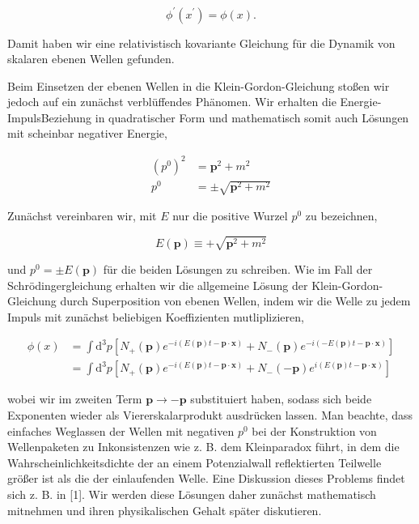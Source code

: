 \documentclass[10pt, letterpaper]{article}
\begin{document}
$$
\phi^{\prime}\left(x^{\prime}\right)=\phi(x) .
$$

Damit haben wir eine relativistisch kovariante Gleichung für die Dynamik von skalaren ebenen Wellen gefunden.

Beim Einsetzen der ebenen Wellen in die Klein-Gordon-Gleichung stoßen wir jedoch auf ein zunächst verblüffendes Phänomen. Wir erhalten die Energie-ImpulsBeziehung in quadratischer Form und mathematisch somit auch Lösungen mit scheinbar negativer Energie,

$$
\begin{aligned}
\left(p^{0}\right)^{2} & =\mathbf{p}^{2}+m^{2} \\
p^{0} & = \pm \sqrt{\mathbf{p}^{2}+m^{2}}
\end{aligned}
$$

Zunächst vereinbaren wir, mit $E$ nur die positive Wurzel $p^{0}$ zu bezeichnen,

$$
E(\mathbf{p}) \equiv+\sqrt{\mathbf{p}^{2}+m^{2}}
$$

und $p^{0}= \pm E(\mathbf{p})$ für die beiden Lösungen zu schreiben. Wie im Fall der Schrödingergleichung erhalten wir die allgemeine Lösung der Klein-Gordon-Gleichung durch Superposition von ebenen Wellen, indem wir die Welle zu jedem Impuls mit zunächst beliebigen Koeffizienten mutliplizieren,

$$
\begin{aligned}
\phi(x) & =\int \mathrm{d}^{3} p\left[N_{+}(\mathbf{p}) e^{-i(E(\mathbf{p}) t-\mathbf{p} \cdot \mathbf{x})}+N_{-}(\mathbf{p}) e^{-i(-E(\mathbf{p}) t-\mathbf{p} \cdot \mathbf{x})}\right] \\
& =\int \mathrm{d}^{3} p\left[N_{+}(\mathbf{p}) e^{-i(E(\mathbf{p}) t-\mathbf{p} \cdot \mathbf{x})}+N_{-}(-\mathbf{p}) e^{i(E(\mathbf{p}) t-\mathbf{p} \cdot \mathbf{x})}\right]
\end{aligned}
$$

wobei wir im zweiten Term $\mathbf{p} \rightarrow-\mathbf{p}$ substituiert haben, sodass sich beide Exponenten wieder als Viererskalarprodukt ausdrücken lassen. Man beachte, dass einfaches Weglassen der Wellen mit negativen $p^{0}$ bei der Konstruktion von Wellenpaketen zu Inkonsistenzen wie z. B. dem Kleinparadox führt, in dem die Wahrscheinlichkeitsdichte der an einem Potenzialwall reflektierten Teilwelle größer ist als die der einlaufenden Welle. Eine Diskussion dieses Problems findet sich z. B. in [1]. Wir werden diese Lösungen daher zunächst mathematisch mitnehmen und ihren physikalischen Gehalt später diskutieren.
\end{document}
